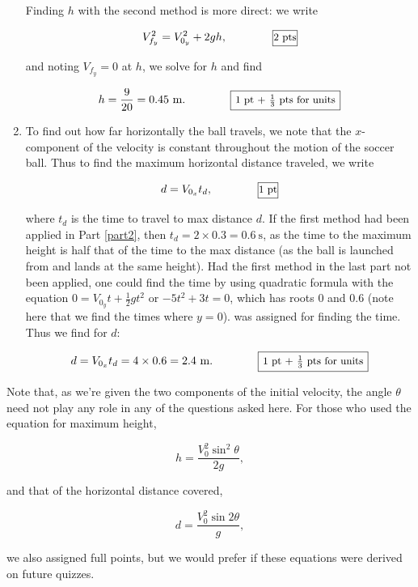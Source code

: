 \documentclass{article}[12pt]
\begin{document}
\begin{large}
\begin{enumerate}
Finding $h$ with the second method is more direct: we write 

$$ V_{f_y}^2 = V_{0_y}^2 + 2gh, \qquad \qquad \begin{small} \framebox[1.1\width]{2 pts} \end{small}$$

and noting $V_{f_y} = 0$ at $h$, we solve for $h$ and find

$$ h = \frac{9}{20} = 0.45 \ \text{m}. \qquad \qquad \begin{small} \framebox[1.1\width]{1 pt + $\frac{1}{3}$ pts for units} \end{small} $$ 

\item To find out how far horizontally the ball travels, we note that the $x$-component of the velocity is constant throughout the motion of the soccer ball. 
Thus to find the maximum horizontal distance traveled, we write 

$$ d = V_{0_x} t_d, \qquad \qquad \begin{small} \framebox[1.1\width]{1 pt} \end{small}$$

where $t_d$ is the time to travel to max distance $d$. If the first method had been applied in Part \ref{part2}, then $t_d = 2 \times 0.3 = 0.6 \ \text{s}$, as 
the time to the maximum height is half that of the time to the max distance (as the ball is launched from and lands at the same height). Had the first method
in the last part not been applied, one could find the time by using quadratic formula with the equation $0 = V_{0_y} t + \frac{1}{2}gt^2$ or
$-5t^2 + 3t = 0$, which has roots 0 and 0.6 (note here that we find the times where $y=0$). 
 was assigned for finding the time. Thus we find for $d$:

$$d = V_{0_x} t_d = 4 \times 0.6 = 2.4 \ \text{m}. \qquad \qquad \begin{small} \framebox[1.1\width]{1 pt + $\frac{1}{3}$ pts for units} \end{small}$$

\end{enumerate}

\noindent Note that, as we're given the two components of the initial velocity, the angle $\theta$ need not play any role in any of the questions asked here. 
For those who used the equation for maximum height, 

$$ h = \frac{V_0^2 \sin^2 \theta}{2g},$$

and that of the horizontal distance covered, 

$$ d = \frac{V_0^2 \sin 2\theta}{g},$$

we also assigned full points, but we would prefer if these equations were derived on future quizzes. 
 
\end{large}
 
 
 
 
 
 
 
 
\end{document}
